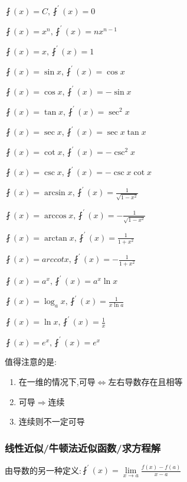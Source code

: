 \documentclass[UTF8]{ctexbook}
\newcommand{\limNormal}[1]{\lim\limits_{#1}}
\newcommand{\derivative}{^\prime}
\newcommand{\myLeftRightArrow}{$\Leftrightarrow$}
\newcommand{\myRightArrow}{$\Rightarrow$}
\newcommand{\fDerivative}[1]{\fint\derivative(#1)}
\newcommand{\defFunction}[1]{f(#1)}
\begin{document}
{{{{    $\fint(x) = C, \fint\derivative(x) = 0$

    $\fint(x) = x^n, \fint\derivative(x) = nx^{n-1}$

    $\fint(x) = x, \fint\derivative(x) = 1$

    $\fint(x) = \sin x, \fint\derivative(x) = \cos x$

    $\fint(x) = \cos x, \fint\derivative(x) = -\sin x$

    $\fint(x) = \tan x, \fint\derivative(x) = \sec^2 x$

    $\fint(x) = \sec x, \fint\derivative(x) = \sec x\tan x$

    $\fint(x) = \cot x, \fint\derivative(x) = -\csc^2 x$

    $\fint(x) = \csc x, \fint\derivative(x) = -\csc x\cot x$

    $\fint(x) = \arcsin x, \fint\derivative(x) = \frac{1}{\sqrt{1 - x^2}}$

    $\fint(x) = \arccos x, \fint\derivative(x) = -\frac{1}{\sqrt{1 - x^2}}$

    $\fint(x) = \arctan x, \fint\derivative(x) = \frac{1}{1 + x^2}$

    $\fint(x) = arccotx, \fint\derivative(x) = -\frac{1}{1 + x^2}$

    $\fint(x) = a^x, \fint\derivative(x) = a^x\ln x$

    $\fint(x) = \log_a x, \fint\derivative(x) = \frac{1}{x\ln a}$

    $\fint(x) = \ln x, \fint\derivative(x)= \frac{1}{x}$

    $\fint(x) = e^x, \fint\derivative(x) = e^x$
  }%
  \newline

  值得注意的是:
  \begin{enumerate}
    \item 在一维的情况下,可导\myLeftRightArrow 左右导数存在且相等

    \item 可导\myRightArrow 连续

    \item 连续则不一定可导
  \end{enumerate}

  \subsubsection{线性近似/牛顿法近似函数/求方程解}{
    由导数的另一种定义:$\fDerivative{x} = \limNormal{x \to a}\frac{\defFunction{x} - \defFunction{a}}{x - a}$

}}}}
\end{document}
